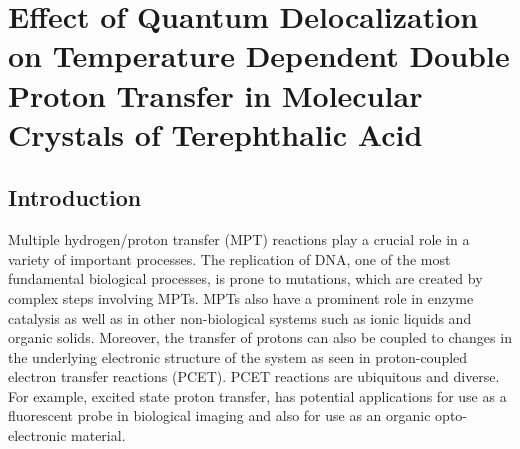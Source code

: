 \chapter{Effect of Quantum Delocalization on Temperature 
Dependent Double Proton Transfer in Molecular Crystals of Terephthalic Acid } \label{chapter1}
\ifpdf
    \graphicspath{{Chapter1/Chapter1Figs/}}
\fi
 
\section{Introduction}
\label{intro}

Multiple hydrogen/proton transfer (MPT) reactions play a crucial role in a variety of important processes. The replication of DNA, one of the most fundamental biological  processes, is prone to mutations,\cite{jacquemin2014assessing} which are created by complex steps involving MPTs. MPTs also have a prominent role in enzyme catalysis\cite{kirby1997efficiency,blomberg2006different,richard2012paradigm} as well as in other non-biological systems such as ionic liquids\cite{yoshizawa2003ionic} and organic solids\cite{horiuchi2008organic}. Moreover, the transfer of protons can also be coupled to changes in the underlying electronic structure of the system as seen in proton-coupled electron transfer reactions (PCET).\cite{huynh2007proton,costentin2010update,hammes2010theory,dempsey2010proton,warren2010thermochemistry} PCET reactions are ubiquitous and diverse. For example, excited state proton transfer\cite{arnaut1993excited,zhou2018unraveling}, has potential applications for use as a fluorescent probe\cite{sedgwick2018excited} in biological imaging\cite{yang2014macro} and also for use as an organic opto-electronic material\cite{kwon2011advanced}.

